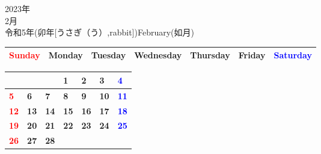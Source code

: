 \documentclass[a4paper,landscape]{jsarticle}
\newcommand{\dig}{\hspace{29mm}}
\newcommand{\tdig}{\hspace{27mm}}
\newcommand{\LBF}{\LARGE\textbf}
\begin{document}
\newpage

\begin{center}
	\HUGE 2023年\\
	\huge 2月\\
	\large 令和5年(卯年[うさぎ（う）,rabbit])February(如月)
\end{center}

\begingroup
\renewcommand{\arraystretch}{1.4}
\begin{tabular}{|>{\centering\arraybackslash}p{32mm}|>{\centering\arraybackslash}p{32mm}|>{\centering\arraybackslash}p{32mm}|>{\centering\arraybackslash}p{32mm}|>{\centering\arraybackslash}p{32mm}|>{\centering\arraybackslash}p{32mm}|>{\centering\arraybackslash}p{32mm}|}
\hline
\textcolor{red}{\large Sunday}&\large Monday&\large Tuesday&\large Wednesday&\large Thursday&\large Friday&\textcolor{blue}{\large Saturday}\\
\hline
\end{tabular}
\endgroup

\begingroup
\renewcommand{\arraystretch}{4}
\begin{tabular}{|p{32mm}|p{32mm}|p{32mm}|p{32mm}|p{32mm}|p{32mm}|p{32mm}|}
\hline
&&&\raisebox{30pt} {\dig\LBF{1}}&\raisebox{30pt} {\dig\LBF{2}}&\raisebox{30pt} {\dig\LBF{3}}&\raisebox{30pt} {\dig\textcolor{blue}{\LBF{4}}}\\
\hline
\raisebox{30pt} {\dig\textcolor{red}{\LBF{5}}}&\raisebox{30pt} {\dig\LBF{6}}&\raisebox{30pt} {\dig\LBF{7}}&\raisebox{30pt} {\dig\LBF{8}}&\raisebox{30pt} {\dig\LBF{9}}&\raisebox{30pt} {\tdig\LBF{10}}&\raisebox{30pt} {\tdig\textcolor{blue}{\LBF{11}}}\\
\hline
\raisebox{30pt} {\tdig\textcolor{red}{\LBF{12}}}&\raisebox{30pt} {\tdig\LBF{13}}&\raisebox{30pt} {\tdig\LBF{14}}&\raisebox{30pt} {\tdig\LBF{15}}&\raisebox{30pt} {\tdig\LBF{16}}&\raisebox{30pt} {\tdig\LBF{17}}&\raisebox{30pt} {\tdig\textcolor{blue}{\LBF{18}}}\\
\hline
\raisebox{30pt} {\tdig\textcolor{red}{\LBF{19}}}&\raisebox{30pt} {\tdig\LBF{20}}&\raisebox{30pt} {\tdig\LBF{21}}&\raisebox{30pt} {\tdig\LBF{22}}&\raisebox{30pt} {\tdig\LBF{23}}&\raisebox{30pt} {\tdig\LBF{24}}&\raisebox{30pt} {\tdig\textcolor{blue}{\LBF{25}}}\\
\hline
\raisebox{30pt} {\tdig\textcolor{red}{\LBF{26}}}&\raisebox{30pt} {\tdig\LBF{27}}&\raisebox{30pt} {\tdig\LBF{28}}&&&&\\
\hline
\end{tabular}
\endgroup

\newpage
\end{document}
